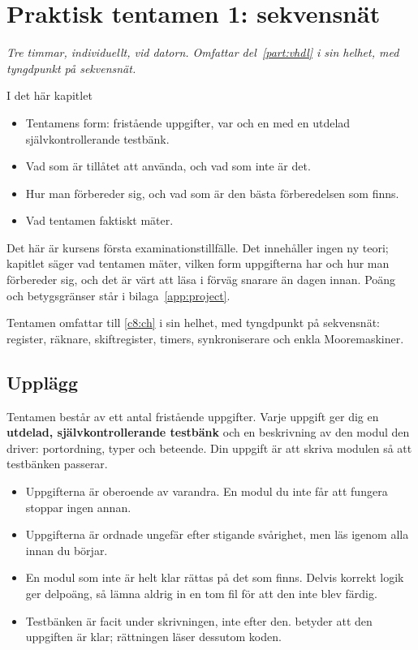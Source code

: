 
\chapter{Praktisk tentamen 1: sekvensnät}
\label{c9:ch}

{\large\itshape Tre timmar, individuellt, vid datorn. Omfattar del~\ref{part:vhdl} i sin helhet, med
tyngdpunkt på sekvensnät.\par}

\begin{chapterbox}{I det här kapitlet}
\begin{itemize}
  \item Tentamens form: fristående uppgifter, var och en med en utdelad självkontrollerande
    testbänk.
  \item Vad som är tillåtet att använda, och vad som inte är det.
  \item Hur man förbereder sig, och vad som är den bästa förberedelsen som finns.
  \item Vad tentamen faktiskt mäter.
\end{itemize}
\end{chapterbox}

Det här är kursens första examinationstillfälle. Det innehåller ingen ny teori; kapitlet säger vad
tentamen mäter, vilken form uppgifterna har och hur man förbereder sig, och det är värt att läsa i
förväg snarare än dagen innan. Poäng och betygsgränser står i bilaga~\ref{app:project}.

Tentamen omfattar  till \ref{c8:ch} i sin helhet, med tyngdpunkt på sekvensnät:
register, räknare, skiftregister, timers, synkroniserare och enkla Mooremaskiner.

\section{Upplägg}
\label{c9:sec:format}

Tentamen består av ett antal fristående uppgifter. Varje uppgift ger dig en \textbf{utdelad,
självkontrollerande testbänk} och en beskrivning av den modul den driver: portordning, typer och
beteende. Din uppgift är att skriva modulen så att testbänken passerar.

\begin{itemize}
  \item Uppgifterna är oberoende av varandra. En modul du inte får att fungera stoppar ingen annan.
  \item Uppgifterna är ordnade ungefär efter stigande svårighet, men läs igenom alla innan du
    börjar.
  \item En modul som inte är helt klar rättas på det som finns. Delvis korrekt logik ger delpoäng,
    så lämna aldrig in en tom fil för att den inte blev färdig.
  \item Testbänken är facit under skrivningen, inte efter den.  betyder att
    den uppgiften är klar; rättningen läser dessutom koden.
\end{itemize}

